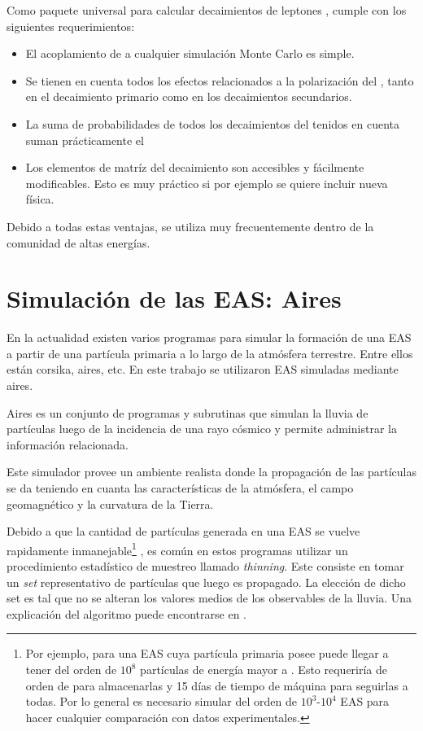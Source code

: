 	Como paquete universal para calcular decaimientos de leptones \tauon{}, \tauola{} cumple con los siguientes requerimientos:
	\begin{itemize}
	\item El acoplamiento de \tauola{} a cualquier simulaci\'on Monte Carlo es simple.
	\item Se tienen en cuenta todos los efectos relacionados a la polarizaci\'on del \tauon{}, tanto en el decaimiento primario como en los decaimientos secundarios.
	\item La suma de probabilidades de todos los decaimientos del \tauon{} tenidos en cuenta suman pr\'acticamente el 
	\item Los elementos de matr\'iz del decaimiento son accesibles y f\'acilmente modificables. Esto es muy pr\'actico si por ejemplo se quiere incluir nueva f\'isica.
	\end{itemize}
	
	Debido a todas estas ventajas, \tauola{} se utiliza muy frecuentemente dentro de la comunidad de altas energ\'ias.
	

	\section{Simulaci\'on de las EAS: Aires}

	En la actualidad existen varios programas para simular la formación de una EAS a partir de una partícula primaria a lo largo de la atmósfera terrestre.
	Entre ellos están {\sc corsika}, {\sc aires}, etc.
	En este trabajo se utilizaron EAS simuladas mediante {\sc aires}.

	{\sc Aires} es un conjunto de programas y subrutinas que simulan la lluvia de partículas luego de la incidencia de una rayo cósmico y permite administrar la información relacionada. 

	Este simulador provee un ambiente realista donde la propagación de las partículas se da teniendo en cuanta las características de la atmósfera, el campo geomagnético y la curvatura de la Tierra. 
	
	Debido a que la cantidad de part\'iculas generada en una EAS se vuelve rapidamente inmanejable\footnote{Por ejemplo, para una EAS cuya part\'icula primaria posee  puede llegar a tener del orden de $10^8$ part\'iculas de energ\'ia mayor a . Esto requerir\'ia de orden de  para almacenarlas y 15 d\'ias de tiempo de m\'aquina para seguirlas a todas. Por lo general es necesario simular del orden de $10^3\textit{-}10^4$ EAS para hacer cualquier comparaci\'on con datos experimentales.
	}
	, es com\'un en estos programas utilizar un procedimiento estadístico de muestreo llamado {\em thinning}.
	Este consiste en tomar un \textit{set} representativo de part\'iculas que luego es propagado.
	La elecci\'on de dicho set es tal que no se alteran los valores medios de los observables de la lluvia.
	Una explicaci\'on del algoritmo puede encontrarse en \cite{thining}.

